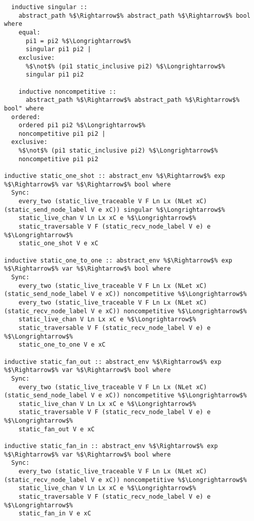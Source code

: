 \documentclass{article}
\begin{document}
\begin{lstlisting}[style=codestyle1, escapechar=\%]


  
  inductive singular ::
    abstract_path %$\Rightarrow$% abstract_path %$\Rightarrow$% bool where
    equal:
      pi1 = pi2 %$\Longrightarrow$% 
      singular pi1 pi2 |
    exclusive:
      %$\not$% (pi1 static_inclusive pi2) %$\Longrightarrow$% 
      singular pi1 pi2

    inductive noncompetitive ::
      abstract_path %$\Rightarrow$% abstract_path %$\Rightarrow$% bool" where
  ordered:
    ordered pi1 pi2 %$\Longrightarrow$% 
    noncompetitive pi1 pi2 |
  exclusive:
    %$\not$% (pi1 static_inclusive pi2) %$\Longrightarrow$% 
    noncompetitive pi1 pi2

inductive static_one_shot :: abstract_env %$\Rightarrow$% exp %$\Rightarrow$% var %$\Rightarrow$% bool where
  Sync:
    every_two (static_live_traceable V F Ln Lx (NLet xC) (static_send_node_label V e xC)) singular %$\Longrightarrow$%
    static_live_chan V Ln Lx xC e %$\Longrightarrow$%
    static_traversable V F (static_recv_node_label V e) e %$\Longrightarrow$%
    static_one_shot V e xC

inductive static_one_to_one :: abstract_env %$\Rightarrow$% exp %$\Rightarrow$% var %$\Rightarrow$% bool where
  Sync:
    every_two (static_live_traceable V F Ln Lx (NLet xC) (static_send_node_label V e xC)) noncompetitive %$\Longrightarrow$%
    every_two (static_live_traceable V F Ln Lx (NLet xC) (static_recv_node_label V e xC)) noncompetitive %$\Longrightarrow$%
    static_live_chan V Ln Lx xC e %$\Longrightarrow$%
    static_traversable V F (static_recv_node_label V e) e %$\Longrightarrow$%
    static_one_to_one V e xC

inductive static_fan_out :: abstract_env %$\Rightarrow$% exp %$\Rightarrow$% var %$\Rightarrow$% bool where
  Sync:
    every_two (static_live_traceable V F Ln Lx (NLet xC) (static_send_node_label V e xC)) noncompetitive %$\Longrightarrow$%
    static_live_chan V Ln Lx xC e %$\Longrightarrow$%
    static_traversable V F (static_recv_node_label V e) e %$\Longrightarrow$%
    static_fan_out V e xC

inductive static_fan_in :: abstract_env %$\Rightarrow$% exp %$\Rightarrow$% var %$\Rightarrow$% bool where
  Sync:
    every_two (static_live_traceable V F Ln Lx (NLet xC) (static_recv_node_label V e xC)) noncompetitive %$\Longrightarrow$%
    static_live_chan V Ln Lx xC e %$\Longrightarrow$%
    static_traversable V F (static_recv_node_label V e) e %$\Longrightarrow$%
    static_fan_in V e xC

  \end{lstlisting}
    
\end{document}

